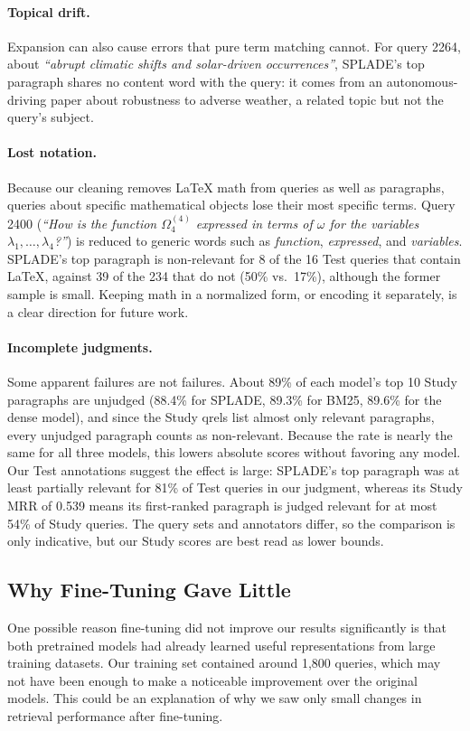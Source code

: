 \documentclass[sigconf,nonacm]{acmart}
\begin{document}
\paragraph{Topical drift.} Expansion can also cause errors that pure term matching 
cannot. For query 2264, about \textit{``abrupt climatic shifts and solar-driven 
occurrences''}, SPLADE's top paragraph shares no content word with the query: it comes 
from an autonomous-driving paper about robustness to adverse weather, a related topic 
but not the query's subject.

\paragraph{Lost notation.} Because our cleaning removes \LaTeX{} math from queries as 
well as paragraphs, queries about specific mathematical objects lose their most 
specific terms. Query 2400 (\textit{``How is the function $\Omega_{4}^{(4)}$ 
expressed in terms of $\omega$ for the variables $\lambda_{1}, \ldots, \lambda_{4}$?''}) 
is reduced to generic words such as \textit{function}, \textit{expressed}, and 
\textit{variables}. SPLADE's top paragraph is non-relevant for 8 of the 16 Test 
queries that contain \LaTeX{}, against 39 of the 234 that do not (50\% vs.\ 17\%), 
although the former sample is small. Keeping math in a normalized form, or encoding 
it separately, is a clear direction for future work.

\paragraph{Incomplete judgments.} Some apparent failures are not failures. About 
89\% of each model's top 10 Study paragraphs are unjudged (88.4\% for SPLADE, 89.3\% 
for BM25, 89.6\% for the dense model), and since the Study qrels list almost only 
relevant paragraphs, every unjudged paragraph counts as non-relevant. Because the 
rate is nearly the same for all three models, this lowers absolute scores without 
favoring any model. Our Test annotations suggest the effect is large: SPLADE's top 
paragraph was at least partially relevant for 81\% of Test queries in our judgment, 
whereas its Study MRR of 0.539 means its first-ranked paragraph is judged relevant 
for at most 54\% of Study queries. The query sets and annotators differ, so the 
comparison is only indicative, but our Study scores are best read as lower bounds.

\subsection{Why Fine-Tuning Gave Little}
\label{sec:why-finetune}
One possible reason fine-tuning did not improve our
results significantly is that both pretrained models had
already learned useful representations from large training
datasets. Our training set contained around 1,800 queries,
which may not have been enough to make a noticeable improvement 
over the original models. This could be an explanation of why
we saw only small changes in retrieval performance after fine-tuning.
\end{document}
